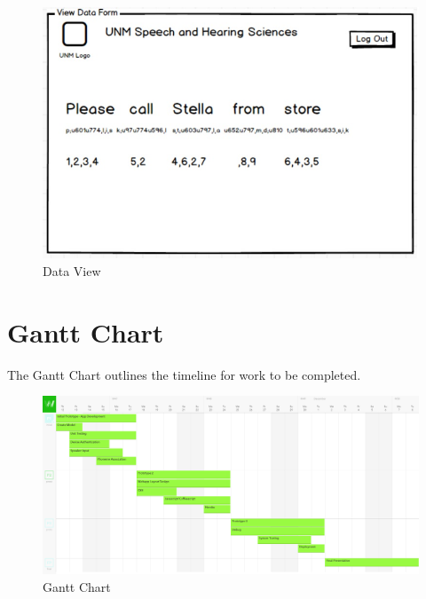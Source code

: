 \documentclass[12pt, a4paper, oneside]{article}
\begin{document}
\begin{figure}
\centering
\includegraphics[width=\textwidth,height=\textheight,keepaspectratio]{./images/Wireframes/ViewData.jpg}
\caption{Data View}
\end{figure}


\pagebreak 
\section*{Gantt Chart}
The Gantt Chart outlines the timeline for work to be completed.

\begin{figure}
\centering
\includegraphics[width=\textwidth,height=\textheight,keepaspectratio]{./images/ganttchart.png}
\caption{Gantt Chart}
\end{figure}
\end{document}
